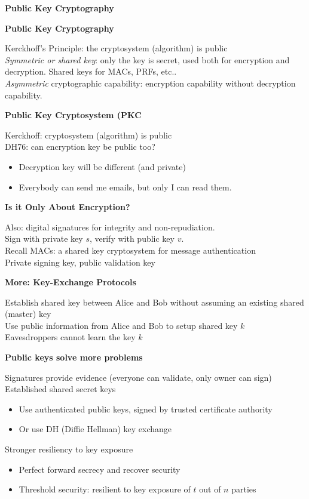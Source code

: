 \documentclass{article}
\begin{document}
\textbf{Public Key Cryptography}

\textbf{Public Key Cryptography}

Kerckhoff's Principle: the cryptosystem (algorithm) is public\\
\textit{Symmetric or shared key}: only the key is secret, used both for encryption and decryption. Shared keys for MACs, PRFs, etc..\\
\textit{Asymmetric} cryptographic capability: encryption capability without decryption capability.

\textbf{Public Key Cryptosystem (PKC}

Kerckhoff: cryptosystem (algorithm) is public\\
DH76: can encryption key be public too?\begin{itemize}
	\item Decryption key will be different (and private)
	\item Everybody can send me emails, but only I can read them.
\end{itemize}

\textbf{Is it Only About Encryption?}

Also: digital signatures for integrity and non-repudiation.\\
Sign with private key $s$, verify with public key $v$.\\
Recall MACs: a shared key cryptosystem for message authentication\\
Private signing key, public validation key

\textbf{More: Key-Exchange Protocols}

Establish shared key between Alice and Bob without assuming an existing shared (master) key\\
Use public information from Alice and Bob to setup shared key $k$\\
Eavesdroppers cannot learn the key $k$

\textbf{Public keys solve more problems}

Signatures provide evidence (everyone can validate, only owner can sign)\\
Established shared secret keys\begin{itemize}
	\item Use authenticated public keys, signed by trusted certificate authority
	\item Or use DH (Diffie Hellman) key exchange
\end{itemize}
Stronger resiliency to key exposure\begin{itemize}
	\item Perfect forward secrecy and recover security
	\item Threshold security: resilient to key exposure of $t$ out of $n$ parties
\end{itemize}
\end{document}
